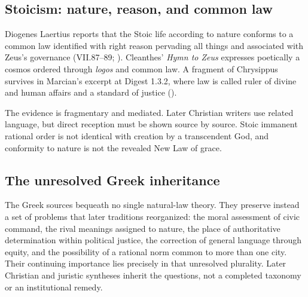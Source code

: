 \subsection{Stoicism: nature, reason, and common law}

Diogenes Laertius reports that the Stoic life according to nature conforms to a common law identified with right reason pervading all things and associated with Zeus's governance (VII.87--89; ). Cleanthes' \emph{Hymn to Zeus} expresses poetically a cosmos ordered through \emph{logos} and common law. A fragment of Chrysippus survives in Marcian's excerpt at Digest 1.3.2, where law is called ruler of divine and human affairs and a standard of justice ().

The evidence is fragmentary and mediated. Later Christian writers use related language, but direct reception must be shown source by source. Stoic immanent rational order is not identical with creation by a transcendent God, and conformity to nature is not the revealed New Law of grace.

\subsection{The unresolved Greek inheritance}

The Greek sources bequeath no single natural-law theory. They preserve instead a set of problems that later traditions reorganized: the moral assessment of civic command, the rival meanings assigned to nature, the place of authoritative determination within political justice, the correction of general language through equity, and the possibility of a rational norm common to more than one city. Their continuing importance lies precisely in that unresolved plurality. Later Christian and juristic syntheses inherit the questions, not a completed taxonomy or an institutional remedy.
